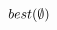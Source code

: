 \documentclass{llncs}
\newcommand{\tru}[0]{\texttt{true}}
\newcommand{\bud}[0]{\ensuremath{{\cal B}}}
\newcommand{\sequence}[0]{\ensuremath{{\cal S}}}
\newcommand{\afeat}[0]{\ensuremath{f}}
\newcommand{\dom}[1][]{\ensuremath{\ifthenelse{\equal{#1}{}}{dom}{dom({#1})}}}
\newcommand{\best}[1][]{\ensuremath{\ifthenelse{\equal{#1}{}}{{best}}{{best({#1})}}}}
\newcommand{\opt}[1][]{\ensuremath{\ifthenelse{\equal{#1}{}}{optimal}{optimal({#1})}}}
\newcommand{\error}[1][]{\ensuremath{\ifthenelse{\equal{#1}{}}{{error}}{{error({{#1}})}}}}
\newcommand{\abranch}[0]{\ensuremath{b}}
\newcommand{\grow}[2]{\ensuremath{{#1}\oplus{#2}}}
\begin{document}
\begin{algorithm}
\begin{footnotesize}
{{			
			
		}
		}
		\Return $\best[\emptyset]$\;
	\end{footnotesize}
	\end{algorithm}
	
\end{document}
